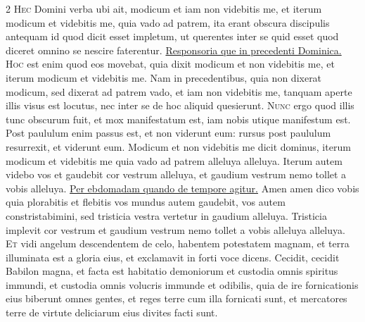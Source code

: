 \begin{multicols*}{2}
\lettrine[lines=2]{\zallmancaps \color{Red} H}{ec} Domini verba ubi ait, modicum et iam non videbitis me, et iterum modicum et videbitis me, quia vado ad patrem, ita erant obscura discipulis antequam id quod dicit esset impletum, ut querentes inter se quid esset quod diceret omnino se nescire faterentur. \ul{Responsoria que in precedenti Dominica.}
\lettrine[lines=2]{\zallmancaps \color{Blue} H}{oc} est enim quod eos movebat, quia dixit modicum et non videbitis me, et iterum modicum et videbitis me. Nam in precedentibus, quia non dixerat modicum, sed dixerat ad patrem vado, et iam non videbitis me, tanquam aperte illis visus est locutus, nec inter se de hoc aliquid quesierunt.
\lettrine[lines=2]{\zallmancaps \color{Red} N}{unc} ergo quod illis tunc obscurum fuit, et mox manifestatum est, iam nobis utique manifestum est. Post paululum enim passus est, et non viderunt eum: rursus post paululum resurrexit, et viderunt eum.
 Modicum et non videbitis me dicit dominus, iterum modicum et videbitis me quia vado ad patrem alleluya alleluya.
 Iterum autem videbo vos et gaudebit cor vestrum alleluya, et gaudium vestrum nemo tollet a vobis alleluya.
\newline \ul{Per ebdomadam quando de tempore agitur.}
 Amen amen dico vobis quia plorabitis et flebitis vos mundus autem gaudebit, vos autem constristabimini, sed tristicia vestra vertetur in gaudium alleluya.
 Tristicia implevit cor vestrum et gaudium vestrum nemo tollet a vobis alleluya alleluya.
\lettrine[lines=2]{\zallmancaps \color{Blue} E}{t} vidi angelum descendentem de celo, habentem potestatem magnam, et terra illuminata est a gloria eius, et exclamavit in forti voce dicens. Cecidit, cecidit Babilon magna, et facta est habitatio demoniorum et custodia omnis spiritus immundi, et custodia omnis volucris immunde et odibilis, quia de ire fornicationis eius biberunt omnes gentes, et reges terre cum illa fornicati sunt, et mercatores terre de virtute deliciarum eius divites facti sunt.

\end{multicols*}
